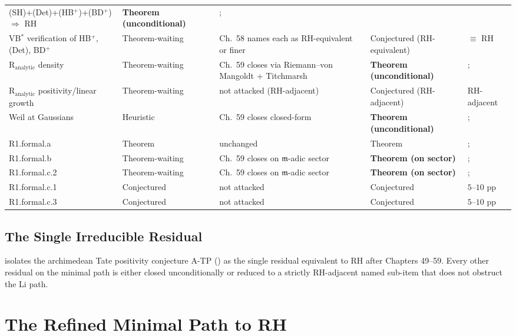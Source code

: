 \begin{center}
\begin{tabular}{p{}|p{}|p{}|p{}|p{}}
(SH)+(Det)+(HB\(^{+}\))+(BD\(^{+}\)) \(\Rightarrow\) RH &
\textbf{Theorem (unconditional)} &; \\
VB\(^{*}\) verification of HB\(^{+}\), (Det), BD\(^{+}\) &
Theorem-waiting & Ch.~58 names each as RH-equivalent or finer &
Conjectured (RH-equivalent) & \(\equiv\) RH \\
\(\mathrm{R}_{\mathrm{analytic}}\) density & Theorem-waiting &
Ch.~59 closes via Riemann--von Mangoldt + Titchmarsh &
\textbf{Theorem (unconditional)} &; \\
\(\mathrm{R}_{\mathrm{analytic}}\) positivity/linear growth &
Theorem-waiting & not attacked (RH-adjacent) & Conjectured
(RH-adjacent) & RH-adjacent \\
Weil at Gaussians & Heuristic & Ch.~59 closes closed-form &
\textbf{Theorem (unconditional)} &; \\
R1.formal.a & Theorem & unchanged & Theorem &; \\
R1.formal.b & Theorem-waiting & Ch.~59 closes on
\(\mathfrak{m}\)-adic sector & \textbf{Theorem (on sector)} &; \\
R1.formal.c.2 & Theorem-waiting & Ch.~59 closes on
\(\mathfrak{m}\)-adic sector & \textbf{Theorem (on sector)} &; \\
R1.formal.c.1 & Conjectured & not attacked & Conjectured & \(5\)--\(10\) pp \\
R1.formal.c.3 & Conjectured & not attacked & Conjectured & \(5\)--\(10\) pp \\
\end{tabular}
\end{center}

\subsection{The Single Irreducible Residual}
\label{v4-arith:w5-synth:crown-jewel}

 isolates the archimedean Tate
positivity conjecture A-TP
() as the single
residual equivalent to RH after Chapters 49--59. Every other residual
on the minimal path is either closed unconditionally or reduced to a
strictly RH-adjacent named sub-item that does not obstruct the Li
path.

\section{The Refined Minimal Path to RH}
\label{v4-arith:w5-synth:refined-minimal-path}

